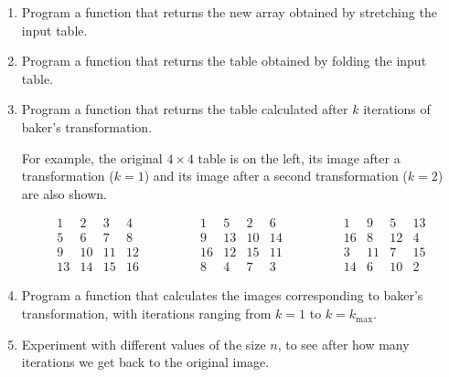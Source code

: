 \documentclass[11pt,class=report,crop=false]{standalone}
\begin{document}
\begin{activite}



\begin{enumerate}
  \item Program a  function that returns the new array obtained by \og{}stretching\fg{} the input table.

    \item Program a  function that returns the table obtained by \og{}folding\fg{} the input table.
  
   \item Program a  function that returns the table calculated after $k$ iterations of baker's transformation.
  
  For example, the original $4 \times 4$ table is on the left, its image after a transformation ($k=1$) and its image after a second transformation ($k=2$) are also shown.
  
 $$\begin{array}{cccc} 
  1& 2& 3& 4\\ 
  5& 6& 7& 8\\  
  9&10&11&12\\  
 13&14&15&16  
\end{array}\qquad\qquad  
 \begin{array}{cccc} 
  1& 5& 2& 6\\ 
  9& 13& 10& 14\\  
  16&12&15&11\\  
  8&4&7&3  
\end{array}\qquad\qquad  
 \begin{array}{cccc} 
   1&    9&    5&   13 \\ 
 16&    8&   12&    4\\  
  3&   11&    7&   15\\  
 14&    6&   10&    2
\end{array}
$$ 
  \item Program a   function that calculates the images corresponding to baker's transformation, with iterations ranging from $k=1$ to $k=k_{\max}$.
  
  \item Experiment with different values of the size $n$, to see after how many iterations we get back to the original image. 
  

\end{enumerate}
\end{activite}
\end{document}
